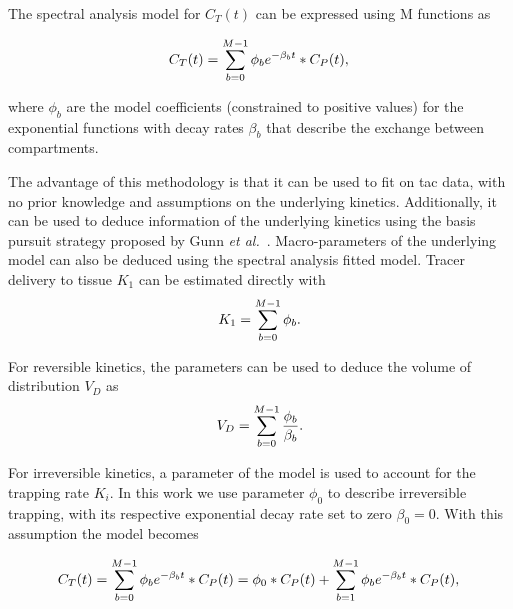 The spectral analysis model for $C_T(t)$ can be expressed using M functions as

\begin{equation} 
\label{eqn:SpectralModel}
C_{T}(t)  =  \sum_{b=0}^{M-1} {\phi_b}  e^{-\beta_b t} \ast C_P(t)   \\ , \\
\end{equation}

where $\phi_b$ are the model coefficients (constrained to positive values) for the exponential functions with decay rates $\beta_b$ that describe the exchange between compartments. 

The advantage of this methodology is that it can be used to fit on \gls{tac} data, with no prior knowledge and assumptions on the underlying kinetics. Additionally, it can be used to deduce information of the underlying kinetics using the basis pursuit strategy proposed by Gunn \textit{et al.}~\cite{Gunn2002}.
Macro-parameters of the underlying model can also be deduced using the spectral analysis fitted model. Tracer delivery to tissue $K_1$ can be estimated directly with
\begin{equation} 
\label{eqn:SpectralModel_K1}
K_1  =  \sum_{b=0}^{M-1} {\phi_b}   \\ . \\
\end{equation}

For reversible kinetics, the parameters can be used to deduce the volume of distribution $V_D$ as
\begin{equation} 
\label{eqn:SpectralModel_VD}
V_D  =  \sum_{b=0}^{M-1} \frac{\phi_b}{\beta_b}   \\ . \\
\end{equation}

For irreversible kinetics, a parameter of the model is used to account for the trapping rate $K_i$. In this work we use parameter ${\phi_0}$ to describe irreversible trapping, with its respective exponential decay rate set to zero ${\beta_0} = 0 $. With this assumption the model becomes

\begin{equation} 
\label{eqn:SpectralModel_Complete}
C_{T}(t)  =  \sum_{b=0}^{M-1} {\phi_b}  e^{-\beta_b t} \ast C_P(t)  =  \phi_0 \ast C_P(t) + \sum_{b=1}^{M-1} {\phi_b}  e^{-\beta_b t} \ast C_P(t)  \\ , \\
\end{equation}


